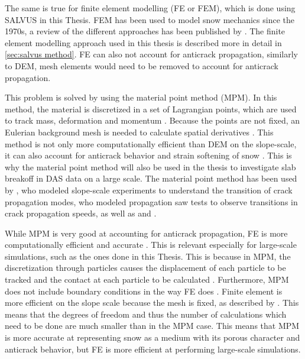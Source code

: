 \documentclass[10pt]{article}
\begin{document}
The same is true for finite element modelling (FE or FEM), which is done using SALVUS in this Thesis. FEM has been used to model snow mechanics since the 1970s, a review of the different approaches has been published by \cite{podolskiyReviewFiniteelementModelling2013}. The finite element modelling approach used in this thesis is described more in detail in \ref{sec:salvus method}. FE can also not account for anticrack propagation, similarly to DEM, mesh elements would need to be removed to account for anticrack propagation. \par

This problem is solved by using the material point method (MPM). In this method, the material is discretized in a set of Lagrangian points, which are used to track mass, deformation and momentum \parencite{bardenhagenMaterialpointMethodGranular2000}. Because the points are not fixed, an Eulerian background mesh is needed to calculate spatial derivatives \parencite{bardenhagenMaterialpointMethodGranular2000}. This method is not only more computationally efficient than DEM on the slope-scale, it can also account for anticrack behavior and strain softening of snow \parencite{gaumeInvestigatingReleaseFlow2019}. This is why the material point method will also be used in the thesis to investigate slab breakoff in DAS data on a large scale. The material point method has been used by \cite{bergfeldSignaturesSubRayleighSupershear2025}, who modeled slope-scale experiments to understand the transition of crack propagation modes, \cite{trottetTransitionSubRayleighAnticrack2022} who modeled propagation saw tests to observe transitions in crack propagation speeds, as well as \cite{gaumeInvestigatingReleaseFlow2019} and \cite{gaumeDynamicAnticrackPropagation2018}. \par

While MPM is very good at accounting for anticrack propagation, FE is more computationally efficient and accurate \cite{lianAdaptiveFiniteElement2012}. This is relevant especially for large-scale simulations, such as the ones done in this Thesis. This is because in MPM, the discretization through particles causes the displacement of each particle to be tracked and the contact at each particle to be calculated \parencite{zhangModellingLargescaleLandslide2023}. Furthermore, MPM does not include boundary conditions in the way FE does \parencite{coombsImmersedFEMMPM2025}. Finite element is more efficient on the slope scale because the mesh is fixed, as described by \parencite{FiniteElementMethod}. This means that the degrees of freedom and thus the number of calculations which need to be done are much smaller than in the MPM case. This means that MPM is more accurate at representing snow as a medium with its porous character and anticrack behavior, but FE is more efficient at performing large-scale simulations. \par
\end{document}
